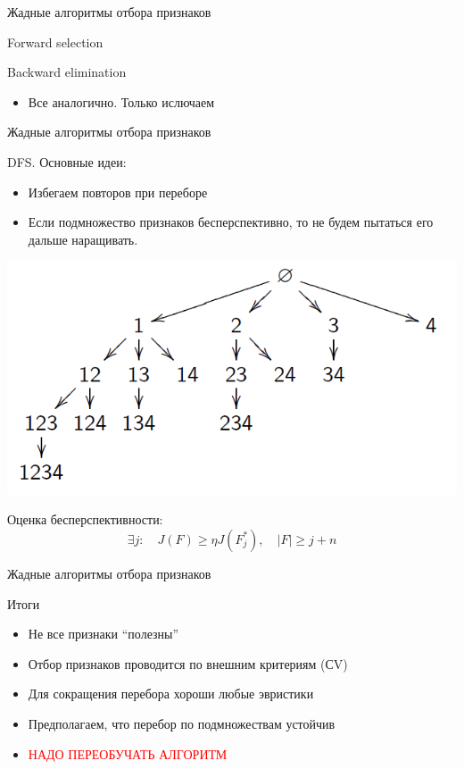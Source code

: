 \documentclass[10pt]{beamer}
\begin{document}
\begin{frame}{Жадные алгоритмы отбора признаков}
    \begin{block}{Forward selection}
    \forsel
    \end{block}
    \begin{block}{Backward elimination}
    \begin{itemize}
        \item Все аналогично. Только ислючаем
    \end{itemize}
    \end{block}
\end{frame}

\begin{frame}{Жадные алгоритмы отбора признаков}
\begin{block}{DFS. Основные идеи:}
\begin{itemize}
    \item Избегаем повторов при переборе
    \item Если подмножество признаков бесперспективно, то не будем пытаться
            его дальше наращивать. 
\end{itemize}
\end{block}
\begin{center}
    \includegraphics[scale=0.3]{images/searchtree.png}
\end{center}

Оценка бесперспективности:
\[
    \exists j: \quad J(F) \ge \eta J(F_j^*), \quad |F| \ge j+n
\]
\end{frame}

\begin{frame}{Жадные алгоритмы отбора признаков}
    \begin{block}{Итоги}
    \begin{itemize}
        \item Не все признаки ``полезны''
        \item Отбор признаков проводится по внешним критериям (СV)
        \item Для сокращения перебора хороши любые эвристики
        \item Предполагаем, что перебор по подмножествам устойчив
        \item \textcolor{red}{{НАДО ПЕРЕОБУЧАТЬ АЛГОРИТМ}}
    \end{itemize}
    \end{block}
\end{frame}
\end{document}
